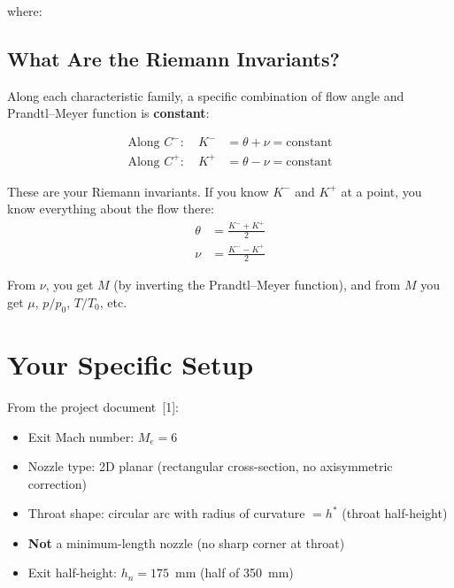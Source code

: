 \documentclass[11pt]{article}
\begin{document}
where:

\subsection{What Are the Riemann Invariants?}

Along each characteristic family, a specific combination of flow angle and Prandtl--Meyer function is \textbf{constant}:

\begin{align}
    \text{Along } C^-: \quad K^- &= \theta + \nu = \text{constant} \\
    \text{Along } C^+: \quad K^+ &= \theta - \nu = \text{constant}
\end{align}

These are your Riemann invariants. If you know $K^-$ and $K^+$ at a point, you know everything about the flow there:
\begin{align}
    \theta &= \frac{K^- + K^+}{2} \\
    \nu &= \frac{K^- - K^+}{2}
\end{align}

From $\nu$, you get $M$ (by inverting the Prandtl--Meyer function), and from $M$ you get $\mu$, $p/p_0$, $T/T_0$, etc.

\section{Your Specific Setup}

From the project document~[1]:
\begin{itemize}
    \item Exit Mach number: $M_e = 6$
    \item Nozzle type: 2D planar (rectangular cross-section, no axisymmetric correction)
    \item Throat shape: circular arc with radius of curvature $= h^*$ (throat half-height)
    \item \textbf{Not} a minimum-length nozzle (no sharp corner at throat)
    \item Exit half-height: $h_n = 175$~mm (half of 350~mm)
\end{itemize}
\end{document}
